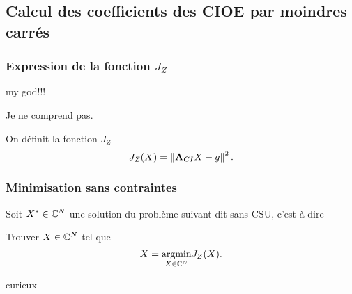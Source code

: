   \subsection{Calcul des coefficients des CIOE par moindres carrés}

    \subsubsection[Expression de la fonction JZ]{Expression de la fonction \(J_Z\)}
      \begin{REM}
my god!!!
\end{REM}
\begin{REP}
  Je ne comprend pas.
\end{REP}
      \begin{defn}
        On définit la fonction \(J_Z\)
        \begin{equation*}
          J_Z(X) = \left\lVert{\mathbf{A}}_{CI}X - {g}\right\rVert^2.
        \end{equation*}
      \end{defn}

    \subsubsection{Minimisation sans contraintes}

      \begin{defn}
        Soit \(X^* \in \mathbb C^N\) une solution du problème suivant dit sans CSU, c'est-à-dire

        Trouver \(X \in \mathbb C^N\) tel que
        \begin{equation*}
          X = {\underset{X\in \mathbb C^N}{\operatorname{argmin}}} J_Z(X).
        \end{equation*}
      \end{defn}

\begin{REM}
curieux
\end{REM}



